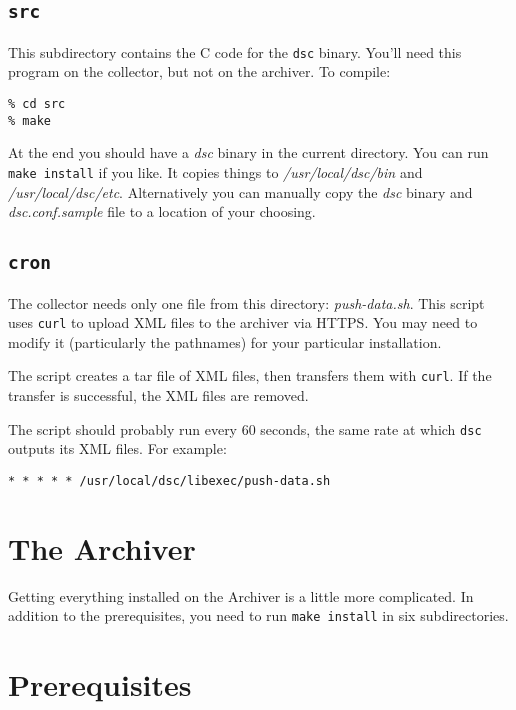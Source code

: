\documentclass{report}
\begin{document}
\subsection{\tt src}

This subdirectory contains the C code for the {\tt dsc\/} binary.
You'll need this program on the collector, but not on the archiver.
To compile:

\begin{verbatim}
% cd src
% make
\end{verbatim}

At the end you should have a {\em dsc\/} binary in the current directory.
You can run {\tt make install\/} if you like.  It copies things to
{\em /usr/local/dsc/bin\/} and {\em /usr/local/dsc/etc\/}.
Alternatively you can manually copy the {\em dsc\/} binary and {\em
dsc.conf.sample\/} file to a location of your choosing.

\subsection{\tt cron}
\label{sec-install-collector-cron}

The collector needs only one file from this directory: {\em
push-data.sh\/}.  This script uses {\tt curl\/} to upload XML files
to the archiver via HTTPS.  You may need to modify it (particularly
the pathnames) for your particular installation.

The script creates a tar file of XML files, then transfers them
with {\tt curl\/}.  If the transfer is successful, the XML files
are removed.

The script should probably run every 60 seconds, the same rate at
which {\tt dsc\/} outputs its XML files.  For example:

\begin{verbatim}
* * * * * /usr/local/dsc/libexec/push-data.sh
\end{verbatim}

\section{The Archiver}

Getting everything installed on the Archiver is a little more complicated.
In addition to the prerequisites, you need to run {\tt make install\/} in
six subdirectories.

\section{Prerequisites}
\end{document}
